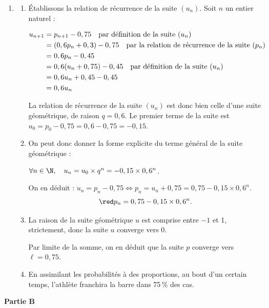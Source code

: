 \begin{enumerate}
Donc on a bien $p_{n+1} = 0,6p_n + 0,3$ : on a donc bien établi la relation de récurrence annoncée.

\item
\begin{enumerate}
\item  Établissons la relation de récurrence de la suite $(u_n)$. Soit $n$ un entier naturel :

$\aligned u_{n+1} &= p_{n+1} - 0,75 \quad \text{par définition de la suite } (u_n)\\
				&= (0,6p_n + 0,3) - 0,75 \quad \text{par la relation de récurrence de la suite } (p_n)\\
				&= 0,6p_n - 0,45\\
				&= 0,6(u_n + 0,75)-0,45\quad \text{par définition de la suite } (u_n)\\
				&=0,6u_n+0,45-0,45\\
				&= 0,6u_n \\ \endaligned$

				La relation de récurrence de la suite $(u_n)$ est donc bien celle d'une suite géométrique, de raison $q = 0,6$. Le premier terme de la suite est $u_0 = p_0 - 0,75 = 0,6 - 0,75 = - 0,15$.
\item On peut donc donner la forme explicite du terme général de la suite géométrique :

$\forall n \in \N, \quad u_n = u_0 \times q^n = -0,15\times 0,6^n$.

On en déduit : $u_n = p_n - 0,75 \iff p_n = u_n + 0,75 = 0,75 - 0,15\times 0,6^n.$
\[\red p_n = 0,75 - 0,15\times 0,6^n.\]
\item La raison de la suite géométrique $u$ est comprise entre $-1$ et 1, strictement, donc la suite $u$ converge vers 0.

Par limite de la somme, on en déduit que la suite $p$ converge vers $\ell=0,75$.
\item En assimilant les probabilités à des proportions,  au bout d'un certain temps,  l'athlète franchira la barre  dans 75\,\% des cas.
\end{enumerate}

\end{enumerate}

\textbf{Partie B}

